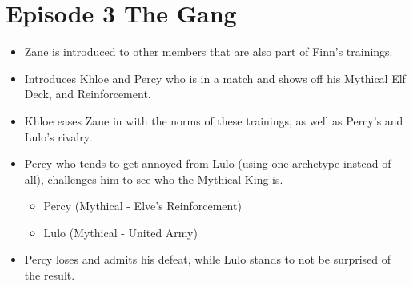 \documentclass[12pt, letterpaper]{article}
\begin{document}
\section*{Episode 3 The Gang}
\begin{itemize}
    \item Zane is introduced to other members that are also part of Finn’s trainings.
    \item Introduces Khloe and Percy who is in a match and shows off his Mythical Elf Deck, and Reinforcement.
    \item Khloe eases Zane in with the norms of these trainings, as well as Percy’s and Lulo’s rivalry.
    \item Percy who tends to get annoyed from Lulo (using one archetype instead of all), challenges him to see who the Mythical King is.
    \begin{itemize}
        \item Percy (Mythical - Elve’s Reinforcement)
        \item Lulo (Mythical - United Army)
    \end{itemize}
    \item Percy loses and admits his defeat, while Lulo stands to not be surprised of the result.
\end{itemize}
\end{document}
